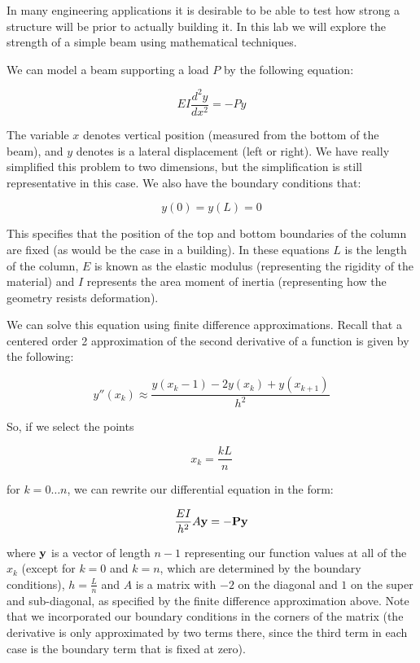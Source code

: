 

In many engineering applications it is desirable to be able to test how strong a structure will be prior to actually building it. In this lab we will explore the strength of a simple beam using mathematical techniques.

We can model a beam supporting a load $P$ by the following equation:

\[
EI \frac{d^2 y}{dx^2} = -P y
\]

The variable $x$ denotes vertical position (measured from the bottom of the beam), and $y$ denotes is a lateral displacement (left or right). We have really simplified this problem to two dimensions, but the simplification is still representative in this case. We also have the boundary conditions that:

\[
y(0) = y(L) =0
\]

This specifies that the position of the top and bottom boundaries of the column are fixed (as would be the case in a building). In these equations $L$ is the length of the column, $E$ is known as the elastic modulus (representing the rigidity of the material) and $I$ represents the area moment of inertia (representing how the geometry resists deformation).

We can solve this equation using finite difference approximations. Recall that a centered order 2 approximation of the second derivative of a function is given by the following:

\[
y''(x_k) \approx \frac{y(x_k-1) - 2y(x_k) + y(x_{k+1})}{h^2}
\]

So, if we select the points

\[
x_k = \frac{kL}{n}
\]

for $k = 0\ldots n$, we can rewrite our differential equation in the form:

\[
\frac{EI}{h^2}A\bf{y} = -P \bf{y}
\]

where $\bf{y}$ is a vector of length $n-1$ representing our function values at all of the $x_k$ (except for $k=0$ and $k=n$, which are determined by the boundary conditions), $h = \frac{L}{n}$ and $A$ is a matrix with $-2$ on the diagonal and $1$ on the super and sub-diagonal, as specified by the finite difference approximation above. Note that we incorporated our boundary conditions in the corners of the matrix (the derivative is only approximated by two terms there, since the third term in each case is the boundary term that is fixed at zero).

